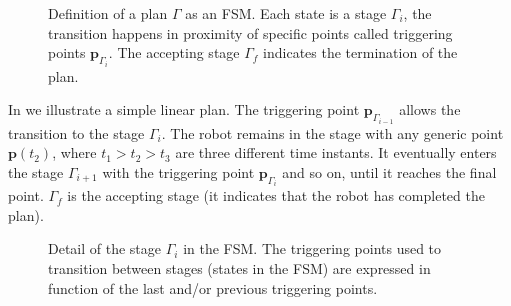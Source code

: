 \begin{figure}[h!]
  \center
  \caption[Definition of a plan]{Definition of a plan $\Gamma$ as an FSM. Each state is a stage $\Gamma_i$, the transition happens in proximity of specific points called triggering points $\mathbf{p}_{\Gamma_i}$. The accepting stage $\Gamma_f$ indicates the termination of the plan.}
  \label{fig:state-machine}
\end{figure}
In  we illustrate a simple linear plan. The triggering point $\mathbf{p}_{\Gamma_{i-1}}$ allows the transition to the stage $\Gamma_i$. The robot remains in the stage with any generic point $\mathbf{p}(t_2)$, where $t_1>t_2>t_3$ are three different time instants. It eventually enters the stage $\Gamma_{i+1}$ with the triggering point $\mathbf{p}_{\Gamma_i}$ and so on, until it reaches the final point. $\Gamma_f$ is the accepting stage (it indicates that the robot has completed the plan).
\begin{figure}[h!]
  \center
\caption[Detail of a stage in the FSM]{Detail of the stage $\Gamma_i$ in the FSM. The triggering points used to transition between stages (states in the FSM) are expressed in function of the last and/or previous triggering points.}
\label{fig:state-machine2}
\end{figure}
